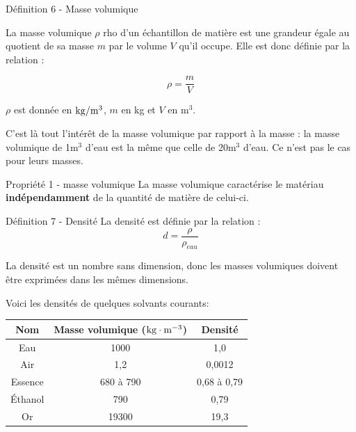 \documentclass[french, a4paper, 12pt, twocolumn, landscape]{article}
\begin{document}
\begin{definition}{Définition 6 -  Masse volumique}
	
	La masse volumique $\rho$ \og{}rho\fg{} d'un échantillon de matière est une grandeur égale au quotient de sa masse $m$ par le volume $V$ qu'il occupe. Elle est donc définie par la relation : 
	
	\begin{equation}
		\rho = \dfrac{m}{V}
	\end{equation}

	$\rho$ est donnée en $\rm kg/m^3$, $m$ en kg et $V$ en m$^3$.
\end{definition}
C'est là tout l'intérêt de la masse volumique par rapport à la masse : la masse volumique de 1m$^3$ d'eau est la même que celle de 20m$^3$ d'eau. Ce n'est pas le cas pour leurs masses. 

\begin{Proposition}{Propriété 1 - masse volumique}
	La masse volumique caractérise le matériau \textbf{indépendamment} de la quantité de matière de celui-ci.
\end{Proposition}\medskip

\begin{definition}{Définition 7 - Densité}
La densité est définie par la relation :
\begin{equation}
	d = \dfrac{\rho}{\rho_{eau}}
\end{equation}

La densité est un nombre sans dimension, donc les masses volumiques doivent être exprimées dans les mêmes dimensions.
\end{definition}

Voici les densités de quelques solvants courants:\smallskip

\begin{table}[ht]
	\centering
	\begin{tabular}{|c|c|c|}
	\hline
	\rowcolor[HTML]{C0C0C0} 
	\textbf{Nom} & \textbf{Masse volumique  ($\rm kg\cdot m^{-3}$)} & \textbf{Densité} \\ \hline
	Eau          & 1000                                             & 1,0              \\ \hline
	Air          & 1,2                                              & 0,0012           \\ \hline
	Essence      & 680 à 790                                        & 0,68 à 0,79      \\ \hline
	Éthanol      & 790                                              & 0,79             \\ \hline
	Or           & 19300                                            & 19,3             \\ \hline
	\end{tabular}%
	\end{table}
\end{document}
